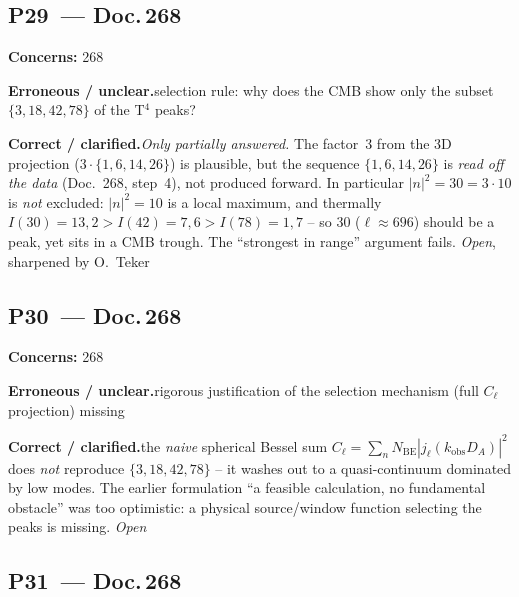 \medskip


\subsection*{P29~--- Doc.\,268}

\noindent\textbf{Concerns:} 268


\smallskip\noindent\textbf{Erroneous / unclear.}\quad selection rule: why does the CMB show only the subset $\{3,18,42,78\}$ of the T$^4$ peaks?


\smallskip\noindent\textbf{Correct / clarified.}\quad \emph{Only partially answered.} The factor~3 from the 3D projection ($3\cdot\{1,6,14,26\}$) is plausible, but the sequence $\{1,6,14,26\}$ is \emph{read off the data} (Doc.~268, step~4), not produced forward. In particular $|n|^2=30=3\cdot10$ is \emph{not} excluded: $|n|^2=10$ is a local maximum, and thermally $I(30)=13{,}2 > I(42)=7{,}6 > I(78)=1{,}7$ -- so $30$ ($\ell\approx696$) should be a peak, yet sits in a CMB trough. The ``strongest in range'' argument fails. \emph{Open}, sharpened by O.~Teker


\medskip


\subsection*{P30~--- Doc.\,268}

\noindent\textbf{Concerns:} 268


\smallskip\noindent\textbf{Erroneous / unclear.}\quad rigorous justification of the selection mechanism (full $C_\ell$ projection) missing


\smallskip\noindent\textbf{Correct / clarified.}\quad the \emph{naive} spherical Bessel sum $C_\ell=\sum_n N_\mathrm{BE}|j_\ell(k_\mathrm{obs}D_A)|^2$ does \emph{not} reproduce $\{3,18,42,78\}$ -- it washes out to a quasi-continuum dominated by low modes. The earlier formulation ``a feasible calculation, no fundamental obstacle'' was too optimistic: a physical source/window function selecting the peaks is missing. \emph{Open}


\medskip


\subsection*{P31~--- Doc.\,268}

